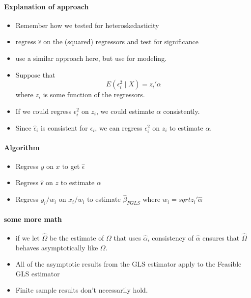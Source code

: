 \paragraph{Explanation of approach}
\label{sec-3-4-1}

\begin{itemize}
\item Remember how we tested for heteroskedasticity
\item regress $\hat\epsilon$ on the (squared) regressors and test
        for significance
\item use a similar approach here, but use for modeling.
\item Suppose that
        \[ E(\epsilon_i^2 \mid X) = z_i'\alpha \]
        where $z_i$ is some function of the regressors.
\item If we could regress $\epsilon_i^2$ on $z_i$, we could estimate
        $\alpha$ consistently.
\item Since $\hat\epsilon_i$ is consistent for $\epsilon_i$, we can
        regress $\epsilon_i^2$ on $z_i$ to estimate $\alpha$.
\end{itemize}
\paragraph{Algorithm}
\label{sec-3-4-2}

\begin{itemize}
\item Regress $y$ on $x$ to get $\hat\epsilon$
\item Regress $\hat \epsilon$ on $z$ to estimate $\alpha$
\item Regress $y_i/w_i$ on $x_i/w_i$ to estimate $\hat\beta_{FGLS}$
        where $w_i = sqrt{z_i'\hat\alpha}$
\end{itemize}
\paragraph{some more math}
\label{sec-3-4-3}

\begin{itemize}
\item if we let $\hat\Omega$ be the estimate of $\Omega$ that uses
        $\hat\alpha$, consistency of $\hat\alpha$ ensures that
        $\hat\Omega$ behaves asymptotically like $\Omega$.
\item All of the asymptotic results from the GLS estimator apply to
        the Feasible GLS estimator
\item Finite sample results don't necessarily hold.
\end{itemize}